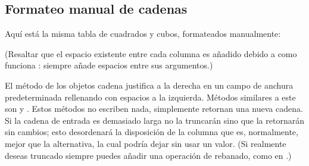 \documentclass[a5paper,10pt,spanish]{sphinxmanual}
\begin{document}
\subsection{Formateo manual de cadenas}
\label{\detokenize{tutorial/inputoutput:manual-string-formatting}}
\sphinxAtStartPar
Aquí está la misma tabla de cuadrados y cubos, formateados manualmente:

\begin{sphinxVerbatim}[commandchars=\\\{\}]
    
      
    
    
\end{sphinxVerbatim}

\sphinxAtStartPar
(Resaltar que el espacio existente entre cada columna es añadido debido a como funciona : siempre añade espacios entre sus argumentos.)

\sphinxAtStartPar
El método  de los objetos cadena justifica a la derecha en un campo de anchura predeterminada  rellenando con espacios a la izquierda. Métodos similares a este son  y . Estos métodos no escriben nada, simplemente retornan una nueva cadena. Si la cadena de entrada es demasiado larga no la truncarán sino que la retornarán sin cambios; esto desordenará la disposición de la columna que es, normalmente, mejor que la alternativa, la cual podría dejar sin usar un valor. (Si realmente deseas truncado siempre puedes añadir una operación de rebanado, como en .)
\end{document}
